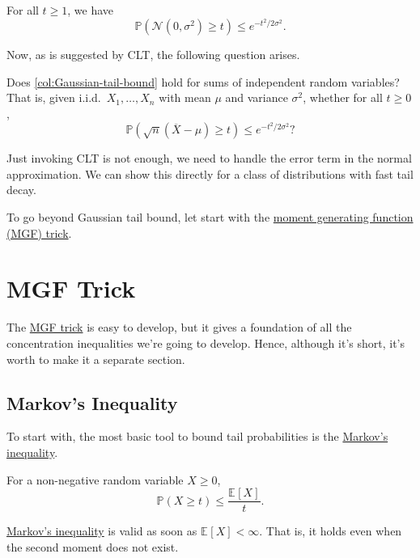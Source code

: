 \begin{corollary}\label{col:Gaussian-tail-bound}
	For all \(t \geq 1\), we have
	\[
		\mathbb{P} (\mathcal{N} (0, \sigma ^{2} ) \geq t) \leq e^{-t^2 / 2\sigma ^{2} }.
	\]
\end{corollary}

Now, as is suggested by CLT, the following question arises.

\begin{problem*}
	Does \autoref{col:Gaussian-tail-bound} hold for sums of independent random variables? That is, given i.i.d.\ \(X_1, \dots , X_n\) with mean \(\mu \) and variance \(\sigma ^{2} \), whether for all \(t \geq 0\),
	\[
		\mathbb{P} (\sqrt{n}(\overline{X} - \mu ) \geq t )\leq e^{-t^2 / 2 \sigma ^{2} }?
	\]
\end{problem*}
\begin{answer}
	Just invoking CLT is not enough, we need to handle the error term in the normal approximation. We can show this directly for a class of distributions with fast tail decay.
\end{answer}

To go beyond Gaussian tail bound, let start with the \hyperref[lma:MGF-trick]{moment generating function (MGF) trick}.

\section{MGF Trick}
The \hyperref[lma:MGF-trick]{MGF trick} is easy to develop, but it gives a foundation of all the concentration inequalities we're going to develop. Hence, although it's short, it's worth to make it a separate section.

\subsection{Markov's Inequality}
To start with, the most basic tool to bound tail probabilities is the \hyperref[lma:Markov-inequality]{Markov's inequality}.

\begin{lemma}\label{lma:Markov-inequality}
	For a non-negative random variable \(X \geq 0\),
	\[
		\mathbb{P} (X \geq t) \leq \frac{\mathbb{E}_{}\left[X \right] }{t}.
	\]
\end{lemma}

\begin{note}
	\hyperref[lma:Markov-inequality]{Markov's inequality} is valid as soon as \(\mathbb{E}_{}\left[X \right] < \infty \). That is, it holds even when the second moment does not exist.
\end{note}

